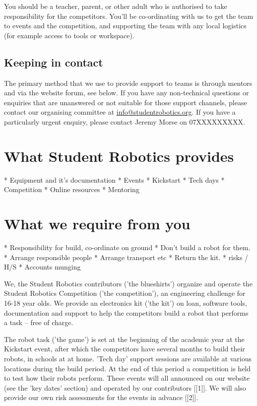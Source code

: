 \documentclass[a4paper]{article}
\begin{document}
You should be a teacher, parent, or other adult who is authorised to take
responsibility for the competitors. You'll be co-ordinating with us to get the
team to events and the competition, and supporting the team with any local
logistics (for example access to tools or workspace).

\subsection{Keeping in contact}

The primary method that we use to provide support to teams is through mentors
and via the website forum, see below. If you have any non-technical questions
or enquiries that are unanswered or not suitable for those support channels,
please contact our organising committee at \url{info@studentrobotics.org}. If
you have a particularly urgent enquiry, please contact Jeremy Morse on
07XXXXXXXXX.

\section*{What Student Robotics provides}

 * Equipment and it's documentation
 * Events
  * Kickstart
  * Tech days
  * Competition
 * Online resources
 * Mentoring

\section*{What we require from you}

 * Responsibility for build, co-ordinate on ground
   * Don't build a robot for them.
 * Arrange responsible people
 * Arrange transport etc
 * Return the kit.
 * risks / H/S
 * Accounts munging
 

We, the Student Robotics contributors ('the blueshirts') organize and
operate the Student Robotics Competition ('the competition'), an
engineering challenge for 16-18 year olds. We provide an electronics kit
('the kit') on loan, software tools, documentation and support to help
the competitors build a robot that performs a task -- free of charge.

The robot task ('the game') is set at the beginning of the academic year
at the Kickstart event, after which the competitors have several months
to build their robots, in schools at at home. 'Tech day' support
sessions are available at various locations during the build period. At
the end of this period a competition is held to test how their robots
perform. These events will all announced on our website (see the 'key
dates' section) and operated by our contributors [[1]]. We will also
provide our own risk assessments for the events in advance [[2]].
\end{document}
